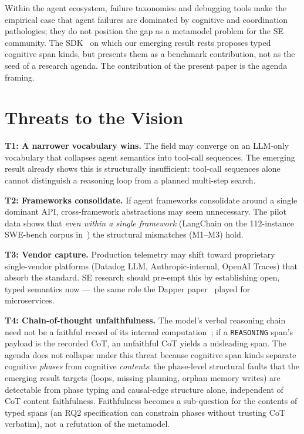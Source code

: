 \documentclass[10pt,conference]{IEEEtran}
\begin{document}
Within the agent ecosystem, failure taxonomies
\cite{mast,agentdebug,aegis} and debugging tools
\cite{agdebugger,agentrx} make the empirical case that agent failures
are dominated by cognitive and coordination pathologies; they do not
position the gap as a metamodel problem for the SE community. The
SDK~\cite{anon_sdk_2026} on which our emerging result rests proposes
typed cognitive span kinds, but presents them as a benchmark
contribution, not as the seed of a research agenda. The contribution
of the present paper is the agenda framing.

\section{Threats to the Vision}
\label{sec:threats}

\textbf{T1: A narrower vocabulary wins.}
The field may converge on an LLM-only vocabulary that collapses agent
semantics into tool-call sequences. The emerging result already shows
this is structurally insufficient: tool-call sequences alone cannot
distinguish a reasoning loop from a planned multi-step search.

\textbf{T2: Frameworks consolidate.}
If agent frameworks consolidate around a single dominant API,
cross-framework abstractions may seem unnecessary. The pilot data
shows that \emph{even within a single framework} (LangChain on the
112-instance SWE-bench corpus in~\cite{anon_sdk_2026}) the structural
mismatches (M1--M3) hold.

\textbf{T3: Vendor capture.}
Production telemetry may shift toward proprietary single-vendor
platforms (Datadog LLM, Anthropic-internal, OpenAI Traces) that
absorb the standard. SE research should pre-empt this by
establishing open, typed semantics now --- the same role the
Dapper paper~\cite{dapper} played for microservices.

\textbf{T4: Chain-of-thought unfaithfulness.}
The model's verbal reasoning chain need not be a faithful record of
its internal computation~\cite{turpin_cot_unfaithful}; if a
\texttt{REASONING} span's payload is the recorded CoT, an
unfaithful CoT yields a misleading span. The agenda does not collapse
under this threat because cognitive span kinds separate cognitive
\emph{phases} from cognitive \emph{contents}: the phase-level
structural faults that the emerging result targets (loops, missing
planning, orphan memory writes) are detectable from phase typing and
causal-edge structure alone, independent of CoT content faithfulness.
Faithfulness becomes a sub-question for the contents of typed spans
(an RQ2 specification can constrain phases without trusting CoT
verbatim), not a refutation of the metamodel.
\end{document}
